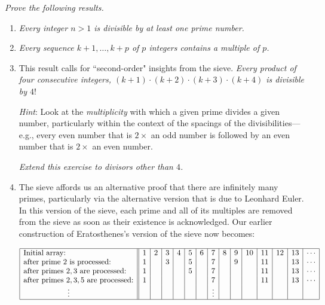 \begin{itemize}
\begin{itemize}
\smallskip

{\em Prove the following results.}
     \begin{enumerate}
     \item
{\em 
Every integer $n>1$ is divisible by at least one prime number.
}

     \medskip\item
{\em 
Every sequence $k+1, \ldots, k+p$ of $p$ integers contains a multiple of $p$.
}

      \medskip\item This result calls for ``second-order" insights from the sieve.
{\em 
Every product of four consecutive integers, $(k+1) \cdot (k+2) \cdot (k+3) \cdot (k+4)$ is divisible by $4!$
}

\smallskip

{\em Hint}:  Look at the {\em multiplicity} with which a given prime divides a given number, particularly within the context of the spacings of the divisibilities---e.g., every even number that is $2 \times$ an odd number is followed by an even number that is $2 \times$ an even number.  

\smallskip

{\em Extend this exercise to divisors other than $4$.}

\medskip\item
The sieve affords us an alternative proof that there are infinitely many primes, particularly via the alternative version that is due to Leonhard Euler.  In this version of the sieve, each prime and all of its multiples are removed from the sieve as soon as their existence is acknowledged.  Our earlier construction of Eratosthenes's version of the sieve now becomes:

\medskip

$\begin{array}{|l||c|c|c|c|c|c|c|c|c|c|c|c|c|c|}
\hline
\mbox{Initial array:} &
1 & 2 & 3 & 4 & 5 & 6 & 7 & 8 & 9 & 10 & 11 & 12 & 13 & \cdots \\
\mbox{after prime $2$ is processed:} &
1 &  & 3 &  & 5 &  & 7 &  & 9 &  & 11 &  & 13 & \cdots \\
\mbox{after primes $2, 3$ are processed:} &
1 &  &  &  & 5 &  & 7 &  &  &  & 11 &  & 13 & \cdots \\
\mbox{after primes $2, 3, 5$ are processed:} &
1 &  &  &  &  &  & 7 &  &  &  & 11 &  & 13 & \cdots \\
\hspace*{.8in} \vdots  &
 &  &  &  &  &  & \vdots &  &  &  &  &  &  & \\
\hline
\end{array}$


\end{enumerate}
\end{itemize}
\end{itemize}
